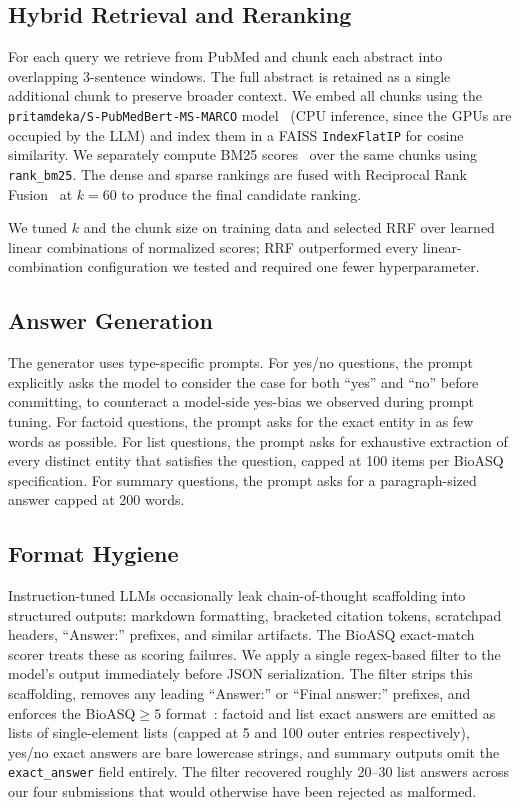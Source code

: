 \documentclass[sigconf,natbib=true]{ceurart}
\begin{document}
\subsection{Hybrid Retrieval and Reranking}

For each query we retrieve from PubMed and chunk each abstract into overlapping 3-sentence windows. The full abstract is retained as a single additional chunk to preserve broader context. We embed all chunks using the \texttt{pritamdeka/S-PubMedBert-MS-MARCO} model~\cite{pubmedbert} (CPU inference, since the GPUs are occupied by the LLM) and index them in a FAISS \texttt{IndexFlatIP} for cosine similarity. We separately compute BM25 scores~\cite{robertson2009bm25} over the same chunks using \texttt{rank\_bm25}. The dense and sparse rankings are fused with Reciprocal Rank Fusion~\cite{rrf2009} at $k{=}60$ to produce the final candidate ranking.

We tuned $k$ and the chunk size on training data and selected RRF over learned linear combinations of normalized scores; RRF outperformed every linear-combination configuration we tested and required one fewer hyperparameter.

\subsection{Answer Generation}

The generator uses type-specific prompts. For yes/no questions, the prompt explicitly asks the model to consider the case for both ``yes'' and ``no'' before committing, to counteract a model-side yes-bias we observed during prompt tuning. For factoid questions, the prompt asks for the exact entity in as few words as possible. For list questions, the prompt asks for exhaustive extraction of every distinct entity that satisfies the question, capped at 100 items per BioASQ specification. For summary questions, the prompt asks for a paragraph-sized answer capped at 200 words.

\subsection{Format Hygiene}

Instruction-tuned LLMs occasionally leak chain-of-thought scaffolding into structured outputs: markdown formatting, bracketed citation tokens, scratchpad headers, ``Answer:'' prefixes, and similar artifacts. The BioASQ exact-match scorer treats these as scoring failures. We apply a single regex-based filter to the model's output immediately before JSON serialization. The filter strips this scaffolding, removes any leading ``Answer:'' or ``Final answer:'' prefixes, and enforces the BioASQ${\geq}5$ format~\cite{bioasq5format}: factoid and list exact answers are emitted as lists of single-element lists (capped at 5 and 100 outer entries respectively), yes/no exact answers are bare lowercase strings, and summary outputs omit the \texttt{exact\_answer} field entirely. The filter recovered roughly 20--30 list answers across our four submissions that would otherwise have been rejected as malformed.
\end{document}

